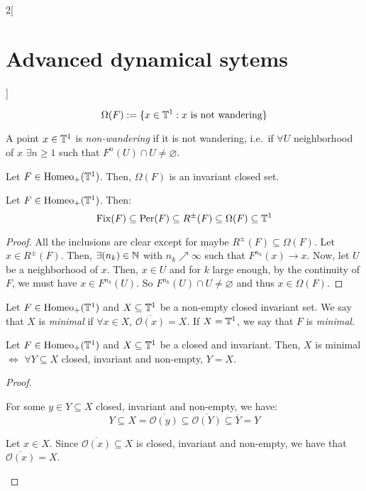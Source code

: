 \documentclass[../../../main_math.tex]{subfiles}
\begin{document}
\begin{multicols}{2}[\section{Advanced dynamical sytems}]
\begin{definition}
    $$
      \Omega(F):=\{ x\in\mathbb{T}^1: x\text{ is not wandering}\}
    $$
  \end{definition}
  \begin{remark}
    A point $x\in\mathbb{T}^1$ is \emph{non-wandering} if it is not wandering, i.e.\ if $\forall U$ neighborhood of $x$ $\exists n\geq 1$ such that $F^n(U)\cap U\ne\varnothing$.
  \end{remark}
  \begin{proposition}
    Let $F\in \mathrm{Homeo}_+(\mathbb{T}^1)$. Then, $\Omega(F)$ is an invariant closed set.
  \end{proposition}
  \begin{lemma}
    Let $F \in \mathrm{Homeo}_+(\mathbb{T}^1)$. Then:
    $$
      \mathrm{Fix}(F)\subseteq \operatorname{Per}(F)\subseteq R^\pm(F)\subseteq \Omega(F)\subseteq \mathbb{T}^1
    $$
  \end{lemma}
  \begin{proof}
    All the inclusions are clear except for maybe $R^\pm(F)\subseteq \Omega(F)$. Let $x\in R^\pm(F)$. Then, $\exists (n_k)\in\mathbb{N}$ with $n_k \nearrow \infty$ such that $F^{n_k}(x)\to x$. Now, let $U$ be a neighborhood of $x$. Then, $x\in U$ and for $k$ large enough, by the continuity of $F$, we must have $x\in F^{n_k}(U)$. So $F^{n_k}(U)\cap U\ne\varnothing$ and thus $x\in \Omega(F)$.
  \end{proof}
  \begin{definition}
    Let $F\in \mathrm{Homeo}_+(\mathbb{T}^1)$ and $X\subseteq \mathbb{T}^1$ be a non-empty closed invariant set. We say that $X$ is \emph{minimal} if $\forall x\in X$, $\overline{\mathcal{O}(x)}=X$. If $X=\mathbb{T}^1$, we say that $F$ is \emph{minimal}.
  \end{definition}
  \begin{proposition}
    Let $F\in \mathrm{Homeo}_+(\mathbb{T}^1)$ and $X\subseteq \mathbb{T}^1$ be a closed and invariant. Then, $X$ is minimal $\iff$ $\forall Y\subseteq X$ closed, invariant and non-empty, $Y=X$.
  \end{proposition}
  \begin{proof}
    \begin{itemizeiff}
      For some $y\in Y\subseteq X$ closed, invariant and non-empty, we have:
      $$Y\subseteq X = \overline{\mathcal{O}(y)}\subseteq \overline{\mathcal{O}(Y)}\subseteq \overline{Y}=Y$$
      \item Let $x\in X$. Since $\overline{\mathcal{O}(x)}\subseteq X$ is closed, invariant and non-empty, we have that $\overline{\mathcal{O}(x)}=X$.
    \end{itemizeiff}
  \end{proof}

\end{multicols}
\end{document}
